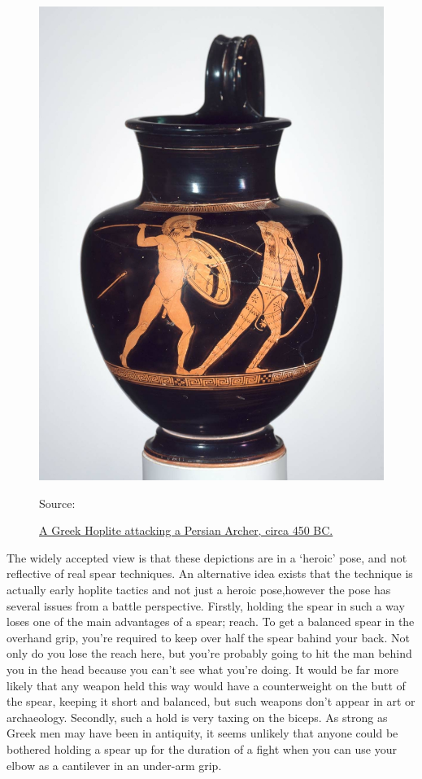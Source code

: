 \documentclass[twoside, a4paper, 12pt]{article}
\newcommand{\source}[1]{\caption*{\hfill Source: {#1}} }
\begin{document}
\begin{figure}
  \centering
  \includegraphics[width=\linewidth]{HopliteArcher.jpg}
  \captionsetup{justification=raggedleft}
  \caption{\ul{A Greek Hoplite attacking a Persian Archer, circa 450 BC.}}
  \source{\cite{MFABoston_2017_hoplite}}
  \label{img:HopliteArcher}
\end{figure}

The widely
accepted view is that these depictions are in a `heroic' pose, and not
reflective of real spear techniques. An alternative idea exists
that the technique is actually early hoplite tactics and not just a heroic
pose,\footnotemark[\value{footnote}] however the pose has several issues from
a battle perspective.
Firstly, holding the spear in such a way loses one of the main advantages of a
spear; reach. To get a balanced spear in the overhand grip, you're required
to keep over half the spear bahind your back. Not only do you lose the reach here,
but you're probably going to hit the man behind you in the head because you
can't see what you're doing. It would be far more likely that any weapon held
this way would have a counterweight on the butt of the spear, keeping it short
and balanced, but such weapons don't appear in art or archaeology. Secondly,
such a hold is very taxing on the biceps. As strong as Greek men may have been
in antiquity, it seems unlikely that anyone could be bothered holding a spear
up for the duration of a fight when you can use your elbow as a cantilever in
an under-arm grip.
\end{document}
